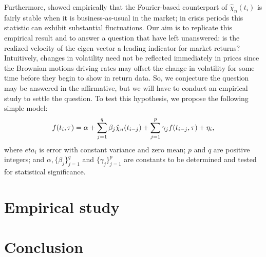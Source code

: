 Furthermore, \cite{Malliavin2007} showed empirically that the  Fourier-based counterpart of $\hat{\chi}_n (t_i)$ is fairly stable  when it is business-as-usual in the market; in crisis periods  this statistic can exhibit substantial fluctuations. Our aim is to replicate this empirical result and to answer a question that \cite{Malliavin2007} have left unanswered: is the realized velocity  of the eigen vector a leading indicator for market returns? Intuitively, changes in volatility need not be reflected immediately in prices since the Brownian motions driving rates may offset the change in volatility for some time before they begin to show in return data. So, we conjecture the question may be answered in the affirmative, but we will have to conduct an empirical study to settle the question. To test this hypothesis,  we propose the following simple model:
\begin{align}
  f(t_i, \tau) = \alpha + \sum_{j=1}^q\beta_j \hat{\chi}_n (t_{i-j}) + \sum_{j=1}^p\gamma_j f(t_{i-j},\tau)+ \eta_i,
  \label{}
\end{align}
where $eta_i$ is \iid error with constant variance and zero mean; $p$ and $q$ are positive integers; and $\alpha, \{\beta_j\}_{j=1}^q$ and $\{\gamma_j\}_{j=1}^p$ are constants to be determined and tested for statistical significance.
\section{Empirical study}
\section{Conclusion}
